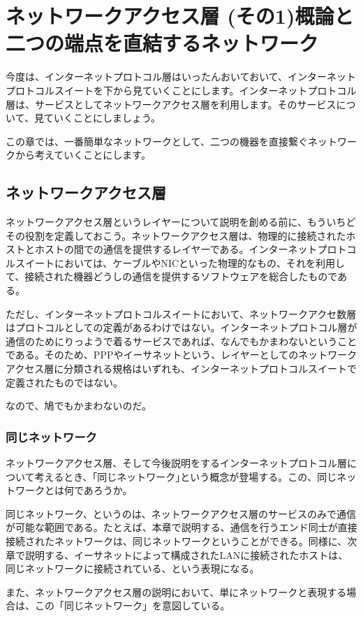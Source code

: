 \chapter{ネットワークアクセス層 (その1)概論と二つの端点を直結するネットワーク}

今度は、インターネットプロトコル層はいったんおいておいて、インターネットプロトコルスイートを下から見ていくことにします。インターネットプロトコル層は、サービスとしてネットワークアクセス層を利用します。そのサービスについて、見ていくことにしましょう。

この章では、一番簡単なネットワークとして、二つの機器を直接繋ぐネットワークから考えていくことにします。


\section{ネットワークアクセス層}
ネットワークアクセス層というレイヤーについて説明を創める前に、もういちどその役割を定義しておこう。ネットワークアクセス層は、物理的に接続されたホストとホストの間での通信を提供するレイヤーである。インターネットプロトコルスイートにおいては、ケーブルやNICといった物理的なもの、それを利用して、接続された機器どうしの通信を提供するソフトウェアを総合したものである。

ただし、インターネットプロトコルスイートにおいて、ネットワークアクセ数層はプロトコルとしての定義があるわけではない。インターネットプロトコル層が通信のためにりっようで着るサービスであれば、なんでもかまわないということである。そのため、PPPやイーサネットという、レイヤーとしてのネットワークアクセス層に分類される規格はいずれも、インターネットプロトコルスイートで定義されたものではない。

なので、鳩でもかまわないのだ。

\subsection{同じネットワーク}
ネットワークアクセス層、そして今後説明をするインターネットプロトコル層について考えるとき、｢同じネットワーク｣という概念が登場する。この、同じネットワークとは何であろうか。

同じネットワーク、というのは、ネットワークアクセス層のサービスのみで通信が可能な範囲である。たとえば、本章で説明する、通信を行うエンド同士が直接接続されたネットワークは、同じネットワークということができる。同様に、次章で説明する、イーサネットによって構成されたLANに接続されたホストは、同じネットワークに接続されている、という表現になる。

また、ネットワークアクセス層の説明において、単にネットワークと表現する場合は、この「同じネットワーク」を意図している。

